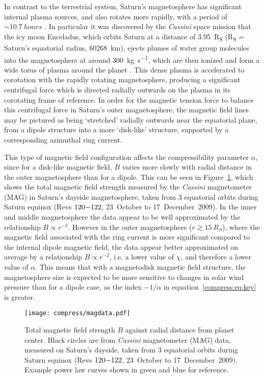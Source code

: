 In contrast to the terrestrial system, Saturn's magnetosphere has significant internal plasma sources, and also rotates more rapidly, with a period of ${\sim}\SI{10.7}{hours}$ \citep{desch1981}. In particular it was discovered by the \textit{Cassini} space mission that the icy moon Enceladus, which orbits Saturn at a distance of \SI{3.95}{R_S} (\si{R_S} = Saturn's equatorial radius, \SI{60268}{km}), ejects plumes of water group molecules into the magnetosphere at around \SI{300}{kg s^{-1}}, which are then ionized and form a wide torus of plasma around the planet \citep{dougherty2006, tokar2006, bagenal2011}. This dense plasma is accelerated to corotation with the rapidly rotating magnetosphere, producing a significant centrifugal force which is directed radially outwards on the plasma in its corotating frame of reference. In order for the magnetic tension force to balance this centrifugal force in Saturn's outer magnetosphere, the magnetic field lines may be pictured as being `stretched' radially outwards near the equatorial plane, from a dipole structure into a more `disk-like' structure, supported by a corresponding azimuthal ring current.

This type of magnetic field configuration affects the compressibility parameter $\alpha$, since for a disk-like magnetic field, $B$ varies more slowly with radial distance in the outer magnetosphere than for a dipole. This can be seen in Figure~\ref{compress:fig:magdata}, which shows the total magnetic field strength measured by the \textit{Cassini} magnetometer (MAG) \citep{dougherty2004} in Saturn's dayside magnetosphere, taken from 3 equatorial orbits during Saturn equinox (Revs $120{\--}122$, 23~October to 17~December~2009). In the inner and middle magnetosphere the data appear to be well approximated by the relationship $B \propto r^{-3}$. However in the outer magnetosphere ($r \gtrsim \SI{15}{R_S}$), where the magnetic field associated with the ring current is more significant compared to the internal dipole magnetic field, the data appear better approximated on average by a relationship $B \propto r^{-2}$, i.e. a lower value of $\chi$, and therefore a lower value of $\alpha$. This means that with a magnetodisk magnetic field structure, the magnetosphere size is expected to be more sensitive to changes in solar wind pressure than for a dipole case, as the index $-1/\alpha$ in equation~\ref{compress:eq:key} is greater.
\begin{figure}
\centering
\noindent\texttt{[image: compress/magdata.pdf]}
\caption[Equatorial magnetic field data from \textit{Cassini} MAG.]{Total magnetic field strength $B$ against radial distance from planet center. Black circles are from \textit{Cassini} magnetometer (MAG) data, measured on Saturn's dayside, taken from 3 equatorial orbits during Saturn equinox (Revs $120{\--}122$, 23~October to 17~December~2009). Example power law curves shown in green and blue for reference.}
\label{compress:fig:magdata}
\end{figure}

